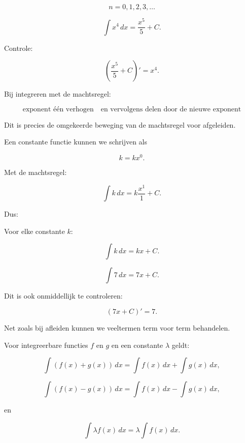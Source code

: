 \documentclass{ximera}
\begin{document}
\[
n=0,1,2,3,\ldots
\]

\begin{voorbeeld}
\[
\int x^4\,dx
=
\frac{x^5}{5}+C.
\]

Controle:

\[
\left(\frac{x^5}{5}+C\right)'
=
x^4.
\]
\end{voorbeeld}

\begin{opmerking}
Bij integreren met de machtsregel:

\[
\boxed{
\text{exponent één verhogen}
\quad\text{en vervolgens delen door de nieuwe exponent}
}
\]

Dit is precies de omgekeerde beweging van de machtsregel voor
afgeleiden.
\end{opmerking}



Een constante functie kunnen we schrijven als

\[
k=kx^0.
\]

Met de machtsregel:

\[
\int k\,dx
=
k\frac{x^1}{1}+C.
\]

Dus:

\begin{eigenschap}
Voor elke constante \(k\):

\[
\boxed{
\int k\,dx=kx+C.
}
\]
\end{eigenschap}

\begin{voorbeeld}
\[
\int 7\,dx=7x+C.
\]
\end{voorbeeld}

Dit is ook onmiddellijk te controleren:

\[
(7x+C)'=7.
\]



Net zoals bij afleiden kunnen we veeltermen term voor term behandelen.

\begin{eigenschap}[Lineariteit]
Voor integreerbare functies \(f\) en \(g\) en een constante
\(\lambda\) geldt:

\[
\int\left(f(x)+g(x)\right)\,dx
=
\int f(x)\,dx+\int g(x)\,dx,
\]

\[
\int\left(f(x)-g(x)\right)\,dx
=
\int f(x)\,dx-\int g(x)\,dx,
\]

en

\[
\int \lambda f(x)\,dx
=
\lambda\int f(x)\,dx.
\]
\end{eigenschap}
\end{document}
